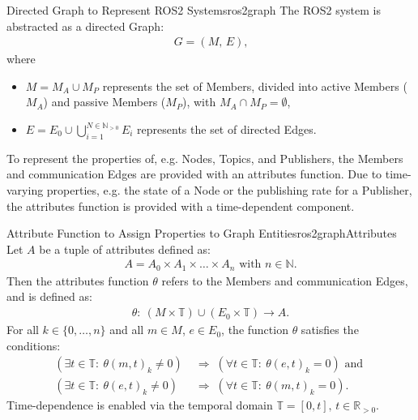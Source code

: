 \begin{samepage}
    \begin{definitionbox}{Directed Graph to Represent ROS2 Systems}{ros2graph}
        The ROS2 system is abstracted as a directed Graph:
        \begin{align*}
            G = (M,\,E)\text{,}
        \end{align*}
        where
        \begin{itemize}[label=$\circ$]
            \item $M = M_A \cup M_P$ represents the set of Members, divided into active Members ($M_A$) and passive Members ($M_P$), with $M_A \cap M_P = \emptyset$,
            \item $E = E_0 \cup \bigcup\limits_{i=1}^{N\in\mathbb{N}_{>0}} E_i$ represents the set of directed Edges.
        \end{itemize}
    \end{definitionbox}
\end{samepage}


    To represent the properties of, e.g. Nodes, Topics, and Publishers, the Members and communication Edges are provided with an attributes function. Due to time-varying properties, e.g. the state of a Node or the publishing rate for a Publisher, the attributes function is provided with a time-dependent component.

    \begin{definitionbox}{Attribute Function to Assign Properties to Graph Entities}{ros2graphAttributes}
        Let $A$ be a tuple of attributes defined as:
        \begin{align*}
            A = A_0 \times A_1 \times \ldots \times A_n\text{ with }n\in\mathbb{N}\text{.}
        \end{align*}
        Then the attributes function $\theta$ refers to the Members and communication Edges, and is defined as:
        \begin{align*}
            \theta\colon\: (M\times\mathbb{T}) \cup (E_0\times\mathbb{T}) \to A\text{.}
        \end{align*}
        \bigskip
        For all $k \in \{0, \dots, n\}$ and all $m \in M$, $e \in E_0$, the function $\theta$ satisfies the conditions:
            \begin{align*}
                \left( \exists t \in \mathbb{T}\colon\: \theta(m, t)_k \neq 0 \right)
                \;&\Rightarrow\;
                \left( \forall t \in \mathbb{T}\colon\: \theta(e, t)_k = 0 \right) \text{ and } \\
                \left( \exists t \in \mathbb{T}\colon\: \theta(e, t)_k \neq 0 \right)
                \;&\Rightarrow\;
                \left( \forall t \in \mathbb{T}\colon\: \theta(m, t)_k = 0 \right)\text{.}
            \end{align*}
        \bigskip
        Time-dependence is enabled via the temporal domain $\mathbb{T}=[0,t],\,t\in \mathbb{R}_{>0}$.
    \end{definitionbox}



